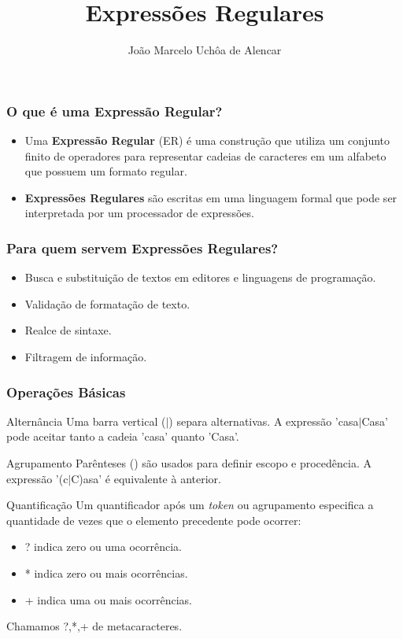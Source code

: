 \documentclass{beamer}
\title{Expressões Regulares}
\author[João Marcelo Uchôa de Alencar]{João Marcelo Uchôa de Alencar}
\institute{Universidade Federal do Ceará - Quixadá}
\begin{document}
   \begin{frame}
      \titlepage
   \end{frame}

   \begin{frame}
      \frametitle{O que é uma Expressão Regular?}
      \begin{itemize}
         \item Uma \textbf{Expressão Regular} (ER) é uma construção que utiliza um conjunto finito de operadores 
         para representar cadeias de caracteres em um alfabeto que possuem um formato regular.  
         \item \textbf{Expressões Regulares} são escritas em uma linguagem formal que pode ser interpretada por um processador de expressões. 
      \end{itemize}
   \end{frame}

   \begin{frame}
      \frametitle{Para quem servem Expressões Regulares?}
      \begin{itemize}
         \item Busca e substituição de textos em editores e linguagens de programação.
         \item Validação de formatação de texto.
         \item Realce de sintaxe.
         \item Filtragem de informação. 
      \end{itemize}
   \end{frame}

   \begin{frame}
      \frametitle{Operações Básicas}
      \begin{block}{Alternância}
      Uma barra vertical ($|$) separa alternativas. A expressão 'casa$|$Casa' pode aceitar tanto a cadeia 'casa' quanto 'Casa'.
      \end{block}
      
      \begin{block}{Agrupamento}
      Parênteses () são usados para definir escopo e procedência. A expressão '(c$|$C)asa' é equivalente à anterior.
      \end{block}
      
      \begin{block}{Quantificação}
      Um quantificador após um \textit{token} ou agrupamento especifica a quantidade de vezes que o elemento precedente pode ocorrer:
      \begin{itemize}
         \item ? indica zero ou uma ocorrência. 
         \item * indica zero ou mais ocorrências. 
         \item + indica uma ou mais ocorrências. 
      \end{itemize}
      Chamamos ?,*,+ de metacaracteres.
      \end{block}
   \end{frame}
\end{document}
